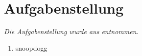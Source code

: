 \section{Aufgabenstellung}
\label{sec:Aufgabenstellung}
\textit{Die Aufgabenstellung wurde aus \cite{LAB} entnommen.}
\begin{enumerate}
    \item snoopdogg
\end{enumerate}
